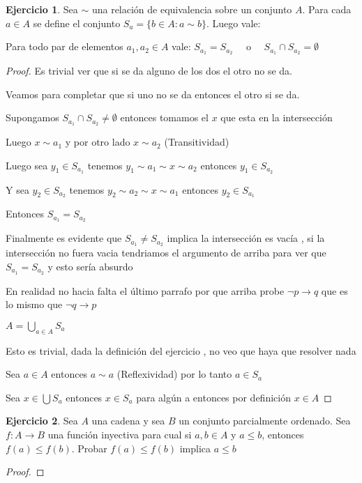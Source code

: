 \documentclass[12pt]{article}
\newcommand{\ra}{\rightarrow}
\theoremstyle{definition}
\newtheorem{ej}{Ejercicio}
\begin{document}
\begin{ej}
Sea $\sim$ una relación de equivalencia sobre un conjunto $A$. Para cada $a \in A$ se define el conjunto $S_{a} = \{b \in A : a \sim b\}$. Luego vale:

\begin{enumerate}[i.]
  \item Para todo par de elementos $a_{1}, a_{2} \in A$ vale: $S_{a_{1}} = S_{a_{2}} \quad$ o $\quad S_{a_{1}} \cap S_{a_{2}} = \emptyset$
    \begin{proof}
      Es trivial ver que si se da alguno de los dos el otro no se da.

      Veamos para completar que si uno no se da entonces el otro si se da.

      Supongamos $S_{a_{1}} \cap S_{a_{2}} \neq \emptyset$ entonces tomamos el $x$ que esta en la intersección

      Luego $x \sim a_{1}$ y por otro lado $x \sim a_{2}$ (Transitividad)

      Luego sea $y_{1} \in S_{a_{1}} $ tenemos $y_{1} \sim a_{1} \sim x \sim a_{2}$ entonces $y_{1} \in S_{a_{2}}$ 

      Y sea $y_{2} \in S_{a_{2}}$ tenemos $y_{2} \sim a_{2} \sim x \sim a_{1}$ entonces $y_{2} \in S_{a_{1}}$

      Entonces $S_{a_1} = S_{a_2}$

      Finalmente es evidente que $S_{a_{1}} \neq S_{a_{2}}$ implica la intersección es vacía , si la intersección no fuera vacia tendriamos el argumento de arriba para ver que $S_{a_{1}} = S_{a_{2}}$ y esto sería absurdo

      En realidad no hacia falta el último parrafo por que arriba probe $\neg p \ra  q$ que es lo mismo que $\neg q \ra p$
    \item $A = \bigcup_{a \in A} S_{a}$ 

    Esto es trivial, dada la definición del ejercicio , no veo que haya que resolver nada

    Sea $a \in A$ entonces $a \sim a$ (Reflexividad) por lo tanto $a \in S_a$

    Sea $x \in \bigcup S_a$ entonces $x \in S_a$ para algún a entonces por definición $x \in A$
\end{proof}

\end{enumerate}
\end{ej}

\begin{ej}
	Sea $A$ una cadena y sea $B$ un conjunto parcialmente ordenado. Sea $f: A \ra B$ una función inyectiva para cual si $a,b \in A$ y $a \leq b$, entonces $f(a) \leq f(b)$. Probar $f(a) \leq f(b)$ implica $a \leq b$
	\begin{proof}
	\end{proof}
\end{ej}
\end{document}
